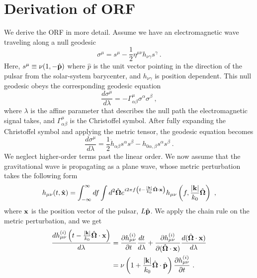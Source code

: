 \documentclass[prd,twocolumn,aps,psfig,nofootinbib,nobibnotes,superscriptaddress,preprintnumbers,times]{revtex4-2}
\begin{document}
\section{Derivation of ORF}\label{app:derivation_orf}
We derive the ORF in more detail. Assume we have an electromagnetic wave traveling along a null geodesic 
\begin{equation}\label{eqn:null}
    \sigma^\mu = s^\mu - \frac{1}{2} \eta^{\mu\nu}h_{\nu \gamma}s^\gamma \ .
\end{equation}
Here, $s^\mu \equiv \nu (1, -\hat{\bf p})$ where $\hat{p}$ is the unit vector pointing in the direction of the pulsar from the solar-system barycenter, and $h_{\nu \gamma}$ is position dependent. This null geodesic obeys the corresponding geodesic equation 
\begin{equation}\label{eqn:geodesic}
    \frac{d\sigma^\mu}{d\lambda} = -\Gamma_{\alpha \beta}^\mu \sigma^\alpha \sigma^\beta \ ,
\end{equation} where $\lambda$ is the affine parameter that describes the null path the electromagnetic signal takes, and $\Gamma_{\alpha \beta}^\mu$ is the Christoffel symbol. After fully expanding the Christoffel symbol and applying the metric tensor, the geodesic equation becomes  
\begin{equation}\label{eqn:geodesic_further}
    \frac{d\sigma^\mu}{d\lambda} = \frac{1}{2}\dot{h}_{\alpha \beta} s^\alpha s^\beta - h_{0\alpha, \beta} s^\alpha s^\beta \ .
\end{equation}
We neglect higher-order terms past the linear order. We now assume that the gravitational wave is propagating as a plane wave, whose metric perturbation takes the following form 
\begin{equation}\label{eqn:plane_wave}
    h_{\mu \nu}(t, \hat{\bf x}) = \int_{-\infty}^\infty df \int d^2 \hat{\bf \Omega} e^{i2\pi f \left(t - \frac{|{\bf k}|}{k_0} \hat{\bf \Omega}\cdot {\bf x}\right)}h_{\mu \nu}\left(f, \frac{|{\bf k}|}{k_0} \hat{\bf \Omega} \right) \ ,
\end{equation}
where ${\bf x}$ is the position vector of the pulsar, $L\hat{\bf p}$. We apply the chain rule on the metric perturbation, and we get
\begin{equation}\label{eqn:dhdlambda}
    \begin{aligned}
        \frac{dh^{(i)}_{\mu \nu} \left(t - \frac{|{\bf k}|}{k_0} \hat{\bf \Omega}\cdot {\bf x}\right) }{d\lambda } &= \frac{\partial h^{(i)}_{\mu \nu}}{\partial t} \frac{dt}{d \lambda} + \frac{\partial h^{(i)}_{\mu \nu}}{\partial (\hat{\bf \Omega}\cdot {\bf x})} \frac{d(\hat{\bf \Omega}\cdot {\bf x})}{d \lambda} \\ &= \nu\left( 1 + \frac{|{\bf k}|}{k_0} \hat{\bf \Omega}\cdot \hat{\bf p}\right) \frac{\partial h^{(i)}_{\mu \nu}}{\partial t} \ .
    \end{aligned}
\end{equation}
\end{document}
